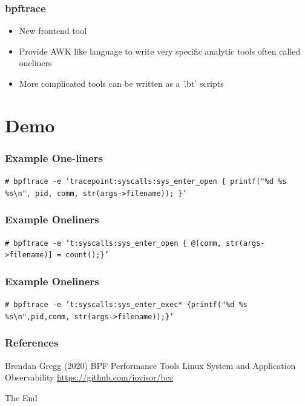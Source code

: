 \documentclass{beamer}
\begin{document}
\begin{frame}
  \frametitle{bpftrace}
  \begin{itemize}
    \item<1-> New frontend tool
    \item<2-> Provide AWK like language to write very specific analytic tools often called oneliners
    \item<3-> More complicated tools can be written as a '.bt' scripts
  \end{itemize}
\end{frame}


\section{Demo}

\begin{frame}%
\frametitle{Example One-liners}
\begin{example}
\texttt {\# bpftrace -e 'tracepoint:syscalls:sys\_enter\_open \{ printf("\%d \%s \%s\textbackslash n", pid, comm, str(args->filename)); \}' }
\end{example}
\end{frame}

\begin{frame}%
\frametitle{Example Oneliners}
\begin{example}
\texttt {\# bpftrace -e 't:syscalls:sys\_enter\_open \{ @[comm, str(args->filename)] = count();\}' }
\end{example}
\end{frame}


\begin{frame}[fragile] %
\frametitle{Example Oneliners}
\begin{example}
  \texttt {\# bpftrace -e 't:syscalls:sys\_enter\_exec* \{printf("\%d \%s \%s\textbackslash n",pid,comm, str(args->filename));\}' }
\end{example}
\end{frame}


\begin{frame}
\frametitle{References}
\footnotesize{
\begin{thebibliography}{99} %
 Brendan Gregg (2020)
\newblock BPF Performance Tools
\newblock Linux System and Application Observability
 \url{https://github.com/iovisor/bcc}
\end{thebibliography}
}
\end{frame}


\begin{frame}
\Huge{\centerline{The End}}
\end{frame}

\end{document}
